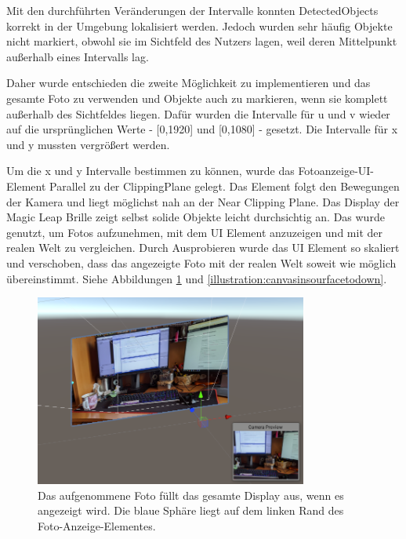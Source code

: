 Mit den durchführten Veränderungen der Intervalle konnten DetectedObjects korrekt in der Umgebung lokalisiert werden. Jedoch wurden sehr häufig Objekte nicht markiert, obwohl sie im Sichtfeld des Nutzers lagen, weil deren Mittelpunkt außerhalb eines Intervalls lag.

Daher wurde entschieden die zweite Möglichkeit zu implementieren und das gesamte Foto zu verwenden und Objekte auch zu markieren, wenn sie komplett außerhalb des Sichtfeldes liegen. 
Dafür wurden die Intervalle für u und v wieder auf die ursprünglichen Werte - [0,1920] und [0,1080] - gesetzt. Die Intervalle für x und y mussten vergrößert werden.

Um die x und y Intervalle bestimmen zu können, wurde das Fotoanzeige-UI-Element Parallel zu der ClippingPlane gelegt. Das Element folgt den Bewegungen der Kamera und liegt möglichst nah an der Near Clipping Plane. Das Display der Magic Leap Brille zeigt selbst solide Objekte leicht durchsichtig an. Das wurde genutzt, um Fotos aufzunehmen, mit dem UI Element anzuzeigen und mit der realen Welt zu vergleichen. Durch Ausprobieren wurde das UI Element so skaliert und verschoben, dass das angezeigte Foto mit der realen Welt soweit wie möglich übereinstimmt. Siehe Abbildungen \ref{illustration:canvasinsourface} und \ref{illustration:canvasinsourfacetodown}.

\begin{figure}[H]
	\centering
	\includegraphics[width=0.8\textwidth]{images/canvasinyourface.PNG}
	\caption[Ränder des Foto-Anzeige-Elements finden]{Das aufgenommene Foto füllt das gesamte Display aus, wenn es angezeigt wird. Die blaue Sphäre liegt auf dem linken Rand des Foto-Anzeige-Elementes.}
	\label{illustration:canvasinsourface}
\end{figure}

